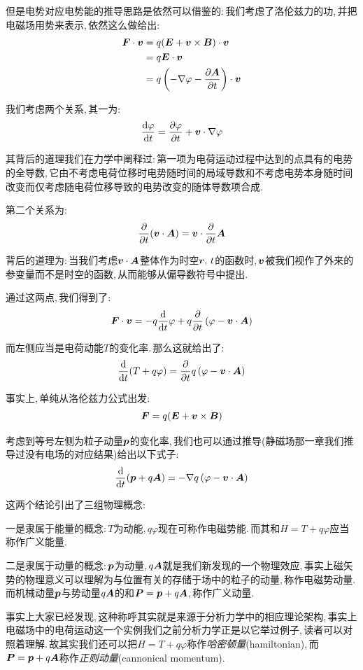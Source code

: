 但是电势对应电势能的推导思路是依然可以借鉴的:\,我们考虑了洛伦兹力的功,\,并把电磁场用势来表示,\,依然这么做给出:
\begin{align*}
\boldsymbol{F}\cdot \boldsymbol{v} &=q(\boldsymbol{E}+\boldsymbol{v}\times \boldsymbol{B})\cdot \boldsymbol{v}\\
&=q\boldsymbol{E}\cdot \boldsymbol{v}\\
&=q \left(-\nabla \varphi-\frac{\partial \boldsymbol{A}}{\partial t}\right)\cdot \boldsymbol{v}
\end{align*}

我们考虑两个关系,\,其一为:
\[\frac{\textrm{d} \varphi}{\textrm{d} t}=\frac{\partial \varphi}{\partial t}+\boldsymbol{v}\cdot \nabla\varphi\]

其背后的道理我们在力学中阐释过:\,第一项为电荷运动过程中达到的点具有的电势的全导数,\,它由不考虑电荷位移时电势随时间的局域导数和不考虑电势本身随时间改变而仅考虑随电荷位移导致的电势改变的随体导数项合成.

第二个关系为:
\[\frac{\partial}{\partial t}(\boldsymbol{v}\cdot \boldsymbol{A})=\boldsymbol{v}\cdot \frac{\partial}{\partial t}\boldsymbol{A}\]

背后的道理为:\,当我们考虑$\boldsymbol{v}\cdot \boldsymbol{A}$整体作为时空$\boldsymbol{r},\,t$的函数时,\,$\boldsymbol{v}$被我们视作了外来的参变量而不是时空的函数,\,从而能够从偏导数符号中提出.

通过这两点,\,我们得到了:
\[\boldsymbol{F}\cdot \boldsymbol{v} =-q\frac{\textrm{d}}{\textrm{d} t}\varphi+q\frac{\partial}{\partial t}\left(\varphi-\boldsymbol{v}\cdot\boldsymbol{A}\right)\]

而左侧应当是电荷动能$T$的变化率.\,那么这就给出了:
\[\frac{\textrm{d}}{\textrm{d} t}(T+q\varphi)=\frac{\partial}{\partial t}q\left(\varphi-\boldsymbol{v}\cdot\boldsymbol{A}\right)\]

事实上,\,单纯从洛伦兹力公式出发:
\[\boldsymbol{F}=q(\boldsymbol{E}+\boldsymbol{v}\times \boldsymbol{B})\]

考虑到等号左侧为粒子动量$\boldsymbol{p}$的变化率,\,我们也可以通过推导(静磁场那一章我们推导过没有电场的对应结果)给出以下式子:
\[\frac{\textrm{d}}{\textrm{d} t}(\boldsymbol{p}+q\boldsymbol{A})=-\nabla q\left(\varphi-\boldsymbol{v}\cdot\boldsymbol{A}\right)\]

这两个结论引出了三组物理概念:

一是隶属于能量的概念:\,$T$为动能,\,$q\varphi$现在可称作电磁势能.\,而其和$H=T+q\varphi$应当称作广义能量.

二是隶属于动量的概念:\,$\boldsymbol{p}$为动量,\,$q\boldsymbol{A}$就是我们新发现的一个物理效应,\,事实上磁矢势的物理意义可以理解为与位置有关的存储于场中的粒子的动量,\,称作电磁势动量.\,而机械动量$\boldsymbol{p}$与势动量$q\boldsymbol{A}$的和$\boldsymbol{P}=\boldsymbol{p}+q\boldsymbol{A}$,\,称作广义动量.

事实上大家已经发现,\,这种称呼其实就是来源于分析力学中的相应理论架构,\,事实上电磁场中的电荷运动这一个实例我们之前分析力学正是以它举过例子,\,读者可以对照着理解.\,故其实我们还可以把$H=T+q\varphi$称作\emph{哈密顿量}(hamiltonian),\,而$\boldsymbol{P}=\boldsymbol{p}+q\boldsymbol{A}$称作\emph{正则动量}(cannonical momentum).

